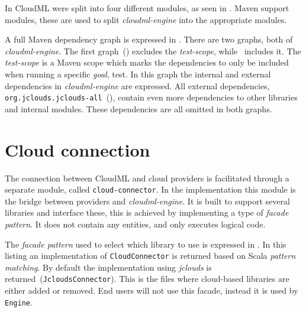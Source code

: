 In  CloudML were split into four different modules, as seen in .
Maven support modules, these are used to split \emph{cloudml-engine} into the appropriate 
modules.

A full Maven dependency graph is expressed in .
There are two graphs, both of \emph{cloudml-engine}.
The first graph~() excludes the \emph{test-scope},
while~ includes it.
The \emph{test-scope} is a Maven scope which marks the dependencies to only be included
when running a specific \emph{goal}, \eg test.
In this graph the internal and external dependencies in \emph{cloudml-engine} are expressed.
All external dependencies, 
\eg \texttt{org.jclouds.jclouds-all}~(),
contain even more dependencies to other libraries and internal modules.
These dependencies are all omitted in both graphs.


\section{Cloud connection}


The connection between CloudML and cloud providers is facilitated 
through a separate module, called \texttt{cloud-connector}.
In the implementation this module is the bridge between providers and \emph{cloudml-engine}.
It is built to support several libraries and interface these,
this is achieved by implementing a type of \emph{facade pattern}.
It does not contain any entities, and only executes logical code. 

The \emph{facade pattern} used to select which library to use is expressed in
.
In this listing an implementation of \texttt{CloudConnector} is returned
based on Scala \emph{pattern matching}.
By default the implementation using \emph{jclouds} is returned~(\texttt{JcloudsConnector}).
This is the files where cloud-based libraries are either added or removed.
End users will not use this facade, instead it is used by \texttt{Engine}.

